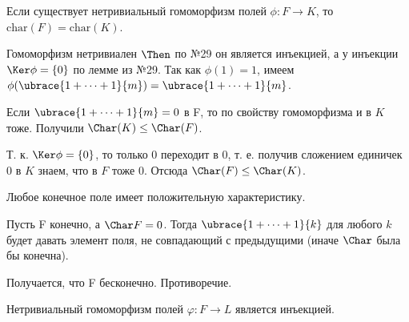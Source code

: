 \begin{problem}
Если существует нетривиальный гомоморфизм полей $\phi: F \to K$, то $\mathrm{char}(F) = \mathrm{char}(K)$.
\end{problem}

\begin{solution}
Гомоморфизм нетривиален $\Then$ по №29 он является инъекцией, а у инъекции \(\Ker \phi = \{0\}\) по лемме из №29.
Так как \(\phi(1) = 1\), имеем \(\phi(\ubrace{1+\dots+1}{m}) = \ubrace{1+\dots+1}{m}\). 

Если \(\ubrace{1+\dots+1}{m} = 0\) в F, то по свойству гомоморфизма и в $K$ тоже. Получили $\Char(K) \le \Char(F)$.

Т. к. \(\Ker \phi = \{0\}\), то только 0 переходит в 0, т. е. получив сложением единичек $0$ в $K$ знаем, что в $F$ тоже $0$. Отсюда $\Char(F) \le \Char(K) $.

\end{solution}

\begin{problem}[28(6.5)]
Любое конечное поле имеет положительную характеристику.
\end{problem}

\begin{solution}
Пусть F конечно, а \(\Char F = 0\). Тогда \(\ubrace{1+\dots+1}{k}\) для любого $k$ будет давать элемент поля, не совпадающий с предыдущими (иначе \(\Char\) была бы конечна).

Получается, что F бесконечно. Противоречие.
\end{solution}

\begin{problem}[29(№6.7)]
Нетривиальный гомоморфизм полей $\varphi: F \to L$ является инъекцией.
\end{problem}

